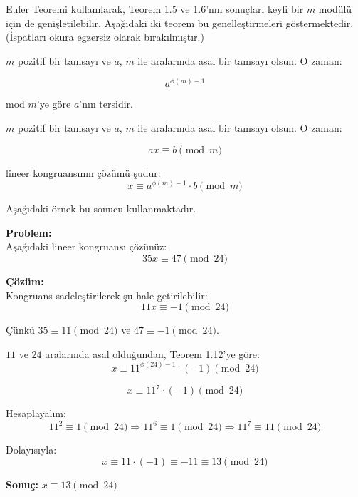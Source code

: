 \vspace{1em}

Euler Teoremi kullanılarak, Teorem 1.5 ve 1.6'nın sonuçları keyfi bir $m$ modülü için de genişletilebilir. Aşağıdaki iki teorem bu genelleştirmeleri göstermektedir. \\
(İspatları okura egzersiz olarak bırakılmıştır.)
\vspace{2em}

\begin{tcolorbox}[colback=gray!10, colframe=black, title=\textbf{Teorem 1.16: Modüler Ters}, fonttitle=\bfseries, sharp corners]
$m$ pozitif bir tamsayı ve $a$, $m$ ile aralarında asal bir tamsayı olsun. O zaman:

\[
a^{\phi(m) - 1}
\]

mod $m$'ye göre $a$'nın tersidir.
\end{tcolorbox}

\vspace{1em}

\begin{tcolorbox}[colback=gray!10, colframe=black, title=\textbf{Teorem 1.12: Lineer Kongruansın Çözümü}, fonttitle=\bfseries, sharp corners]
$m$ pozitif bir tamsayı ve $a$, $m$ ile aralarında asal bir tamsayı olsun. O zaman:

\[
ax \equiv b \pmod{m}
\]

lineer kongruansının çözümü şudur:
\[
x \equiv a^{\phi(m) - 1} \cdot b \pmod{m}
\]
\end{tcolorbox}

\vspace{1em}

Aşağıdaki örnek bu sonucu kullanmaktadır.

\vspace{2em}

\begin{tcolorbox}[colback=gray!5, colframe=black, title=\textbf{Örnek 1.27: Lineer Kongruansın Çözümü}, fonttitle=\bfseries, sharp corners]
\textbf{Problem:}\\
Aşağıdaki lineer kongruansı çözünüz:
\[
35x \equiv 47 \pmod{24}
\]

\textbf{Çözüm:}\\
Kongruans sadeleştirilerek şu hale getirilebilir:
\[
11x \equiv -1 \pmod{24}
\]

Çünkü $35 \equiv 11 \pmod{24}$ ve $47 \equiv -1 \pmod{24}$.

$11$ ve $24$ aralarında asal olduğundan, Teorem 1.12'ye göre:
\[
x \equiv 11^{\phi(24)-1} \cdot (-1) \pmod{24}
\]

\[
x \equiv 11^7 \cdot (-1) \pmod{24}
\]

Hesaplayalım:
\[
11^2 \equiv 1 \pmod{24} \Rightarrow 11^6 \equiv 1 \pmod{24}
\Rightarrow 11^7 \equiv 11 \pmod{24}
\]

Dolayısıyla:
\[
x \equiv 11 \cdot (-1) \equiv -11 \equiv 13 \pmod{24}
\]

\textbf{Sonuç:} $x \equiv 13 \pmod{24}$
\end{tcolorbox}

